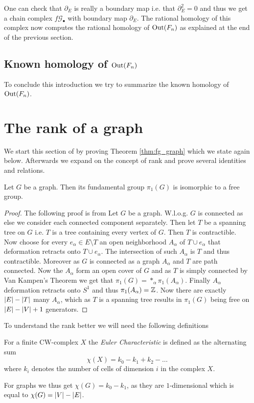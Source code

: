 One can check that $\partial_{E}$ is really a boundary map i.e. that $\partial_{E}^2 = 0$ and thus
we get a chain complex $f\mathcal{G}_{\bullet}$ with boundary map $\partial_{E}$.
The rational homology of this complex now computes the rational homology of $\operatorname{Out}(F_{n})$ as
explained at the end of the previous section.


\subsection{Known homology of \boldmath$\operatorname{Out}(F_{n})$}
To conclude this introduction we try to summarize the known homology of $\operatorname{Out}(F_{n})$.

\newpage


\section{The rank of a graph}\label{sec:RankGraph}
We start this section of by proving Theorem \ref{thm:fg_graph} which we state again below.
Afterwards we expand on the concept of rank and prove several identities and relations.

\begin{theorem}
	Let $G$ be a graph. Then its fundamental group $\pi_{1}(G)$ is isomorphic to a free group.
\end{theorem}

\begin{proof}
	The following proof is from \cite[p. 43f]{hatcher00}
	Let $G$ be a graph. W.l.o.g. $G$ is connected as else we consider each connected component separately. 
	Then let $T$ be a spanning tree on $G$ i.e. $T$ is a tree containing every vertex of $G$.
	Then $T$ is contractible.
	Now choose for every $e_{\alpha} \in E \setminus T$ an open neighborhood $A_{\alpha}$ of $T \cup e_{\alpha}$ that deformation retracts onto $T \cup e_{\alpha}$.
	The intersection of such $A_{\alpha}$ is $T$ and thus contractible. Moreover as $G$ is connected as a graph $A_{\alpha}$ and $T$ are path connected.
	Now the $A_{\alpha}$ form an open cover of $G$ and as $T$ is simply connected by Van Kampen's Theorem we get that $\pi_{1}(G) = *_{\alpha} \pi_{1}(A_{\alpha})$.
	Finally $A_{\alpha}$ deformation retracts onto $S^{1}$ and thus $\pi_{1}(A_{\alpha}) = \mathbb{Z}$. Now there are exactly $\abs{E} - \abs{T}$ many $A_{\alpha}$,
	which as $T$ is a spanning tree results in $\pi_1(G)$ being free on $\abs{E} - \abs{V} + 1$ generators.
\end{proof}

To understand the rank better we will need the following definitions
\begin{definition}
	For a finite CW-complex $X$ the \emph{Euler Characteristic} is defined as the alternating sum
	\[
		\chi(X) = k_0 - k_1 + k_2 - \ldots
	\] 
	where $k_{i}$ denotes the number of cells of dimension $i$ in the complex $X$.
\end{definition}
For graphs we thus get $\chi (G) = k_0 - k_1$, as they are $1$-dimensional which is equal to $\chi(G) = \abs{V} - \abs{E}$.

